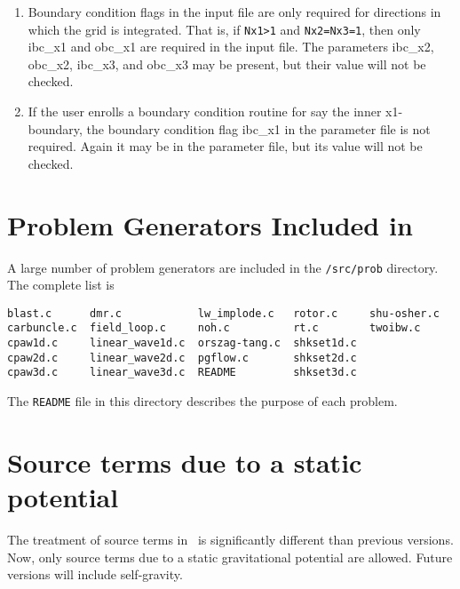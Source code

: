 \begin{enumerate}

\item Boundary condition flags in the input file are only required for 
directions in which the grid is integrated.  That is, if {\tt Nx1>1}
and {\tt Nx2=Nx3=1}, then only ibc\_x1 and obc\_x1 are required in the
input file.  The parameters ibc\_x2, obc\_x2, ibc\_x3, and obc\_x3
may be present, but their value will not be checked.

\item If the user enrolls a boundary condition routine for say the inner
x1-boundary, the boundary condition flag ibc\_x1 in the parameter file
is not required.  Again it may be in the parameter file, but its value
will not be checked.

\end{enumerate}

\section{Problem Generators Included in \ath}

A large number of problem generators are included in the {\tt /src/prob}
directory.  The complete list is
\begin{verbatim}
blast.c      dmr.c            lw_implode.c   rotor.c     shu-osher.c
carbuncle.c  field_loop.c     noh.c          rt.c        twoibw.c
cpaw1d.c     linear_wave1d.c  orszag-tang.c  shkset1d.c
cpaw2d.c     linear_wave2d.c  pgflow.c       shkset2d.c
cpaw3d.c     linear_wave3d.c  README         shkset3d.c
\end{verbatim}
The {\tt README} file in this directory describes the purpose of each
problem.

\section{Source terms due to a static potential}

The treatment of source terms in \ath\ is significantly different than
previous versions.  Now, only source terms due to a static gravitational
potential are allowed.  Future versions will include self-gravity.

